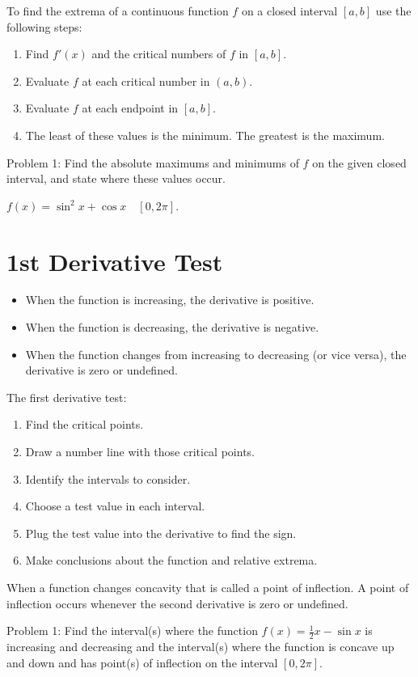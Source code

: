 \documentclass[../abcalc.tex]{subfiles}
\begin{document}
To find the extrema of a continuous function $f$ on a closed interval $[a,b]$ use the following steps:
\begin{enumerate}
    \item Find $f'(x)$ and the critical numbers of $f$ in $[a,b]$.
    \item Evaluate $f$ at each critical number in $(a,b)$.
    \item Evaluate $f$ at each endpoint in $[a,b]$.
    \item The least of these values is the minimum. The greatest is the maximum.
\end{enumerate}

Problem 1: Find the absolute maximums and minimums of $f$ on the given closed interval, and state where these values occur.

$f(x) = \sin^2 x + \cos x \quad [0,2\pi]$.
\section{1st Derivative Test}
\begin{itemize}
    \item When the function is increasing, the derivative is positive.
    \item When the function is decreasing, the derivative is negative.
    \item When the function changes from increasing to decreasing (or vice versa), the derivative is zero or undefined.
\end{itemize}

The first derivative test:
\begin{enumerate}
    \item Find the critical points.
    \item Draw a number line with those critical points.
    \item Identify the intervals to consider.
    \item Choose a test value in each interval.
    \item Plug the test value into the derivative to find the sign.
    \item Make conclusions about the function and relative extrema.
\end{enumerate}

When a function changes concavity that is called a point of inflection. A point of inflection occurs whenever the second derivative is zero or undefined.

Problem 1: Find the interval(s) where the function $f(x)=\frac{1}{2}x-\sin x$ is increasing and decreasing and the interval(s) where the function is concave up and down and has point(s) of inflection on the interval $[0,2\pi]$.
\end{document}
